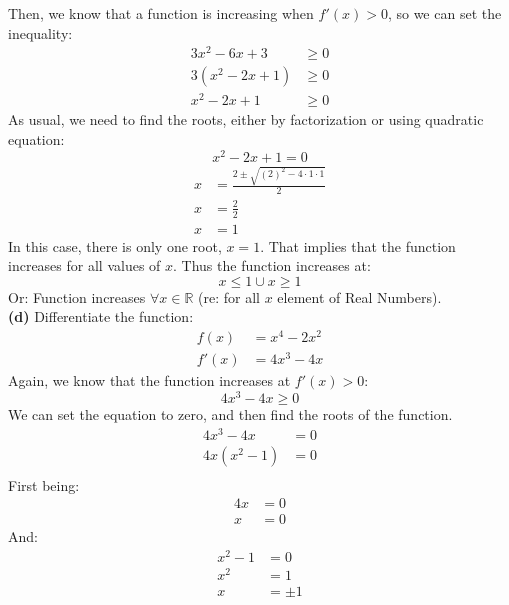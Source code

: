 \documentclass[hidelinks, a4paper, 12pt]{article}
\newcommand{\bd}{\textbf}
\newcommand{\n}{\\[\baselineskip]}
\newcommand{\real}{\mathbb{R}}
\begin{document}
                Then, we know that a function is increasing when $f'(x) > 0$, so we can set the inequality:
                \[\begin{split}
                    3x^2 - 6x + 3&\geq 0\\
                    3(x^2 - 2x + 1) &\geq 0\\
                    x^2 - 2x + 1 &\geq 0
                \end{split}\]
                As usual, we need to find the roots, either by factorization or using quadratic equation:
                \[x^2 - 2x + 1 = 0\]
                \[\begin{split}
                    x &= \frac{2 \pm \sqrt{(2)^2-4\cdot 1 \cdot 1}}{2}\\
                    x &= \frac{2}{2}\\
                    x &= 1
                \end{split}\]
                In this case, there is only one root, $x = 1$. That implies that the function increases for all values of $x$. Thus the function increases at:
                \[x \leq 1 \cup x \geq 1\]
                Or: Function increases $\forall x \in \real$ (re: for all $x$ element of Real Numbers).\n
                \bd{(d)} Differentiate the function:
                \[\begin{split}
                    f(x) &= x^4 - 2x^2\\
                    f'(x) &= 4x^3 - 4x
                \end{split}\]
                Again, we know that the function increases at $f'(x) > 0$:
                \[4x^3 - 4x \geq 0\]
                We can set the equation to zero, and then find the roots of the function.
                \[\begin{split}
                    4x^3 - 4x &= 0\\
                    4x(x^2 - 1) &= 0\\
                \end{split}\]
                First being:
                \[\begin{split}
                    4x &= 0\\
                    x &= 0
                \end{split}\]
                And:
                \[\begin{split}
                    x^2-1 &= 0\\
                    x^2 &= 1\\
                    x &= \pm 1
                \end{split}\]
\end{document}
